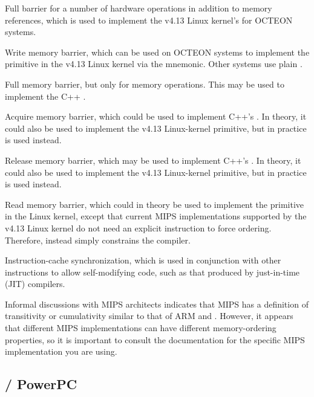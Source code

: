 \begin{description}[style=nextline]
\item[\tco{SYNC}]
	Full barrier for a number of hardware operations in addition
	to memory references, which is used to implement the v4.13
	Linux kernel's  for OCTEON systems.
\item[\tco{SYNC_WMB}]
	Write memory barrier, which can be used on OCTEON systems
	to implement the
	 primitive in the v4.13 Linux kernel via the
	 mnemonic.
	Other systems use plain .
\item[\tco{SYNC_MB}]
	Full memory barrier, but only for memory operations.
	This may be used to implement the 
	C++ .
\item[\tco{SYNC_ACQUIRE}]
	Acquire memory barrier, which could be used to implement
	C++'s .
	In theory, it could also be used to implement the v4.13 Linux-kernel
	 primitive, but in practice
	 is used instead.
\item[\tco{SYNC_RELEASE}]
	Release memory barrier, which may be used to implement
	C++'s .
	In theory, it could also be used to implement the v4.13 Linux-kernel
	 primitive, but in practice
	 is used instead.
\item[\tco{SYNC_RMB}]
	Read memory barrier, which could in theory be used to implement the
	 primitive in the Linux kernel, except that current
	MIPS implementations supported by the v4.13 Linux kernel do not
	need an explicit instruction to force ordering.
	Therefore,  instead simply constrains the compiler.
\item[\tco{SYNCI}]
	Instruction-cache synchronization, which is used in conjunction with
	other instructions to allow self-modifying code, such as that produced
	by just-in-time (JIT) compilers.
\end{description}

Informal discussions with MIPS architects indicates that MIPS has a
definition of transitivity or cumulativity similar to that of
ARM and \Power{}.
However, it appears that different MIPS implementations can have
different memory-ordering properties, so it is important to consult
the documentation for the specific MIPS implementation you are using.

\subsection{\Power{} / PowerPC}
\label{sec:memorder:POWER / PowerPC}

